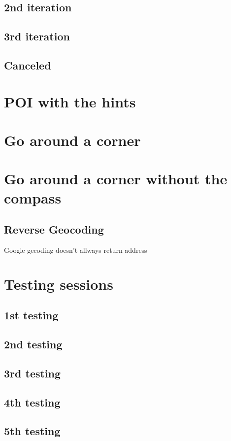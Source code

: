 \documentclass[11pt,oneside,a4paper]{book}
\begin{document}
			\subsection{2nd iteration}			
			\subsection{3rd iteration}	
		\subsection{Canceled}		
		\section{POI with the hints}
		\section{Go around a corner}
		\section{Go around a corner without the compass}				
		\subsection{Reverse Geocoding}
			Google gecoding doesn't allways return address
		
		
						
		
		\section{Testing sessions}
			\subsection{1st testing}
				\label{sec:1th-testing}
			\subsection{2nd testing}
				\label{sec:2th-testing}
			\subsection{3rd testing}
				\label{sec:3th-testing}
			\subsection{4th testing}
				\label{sec:4th-testing}
			\subsection{5th testing}
				\label{sec:5th-testing}
\end{document}
